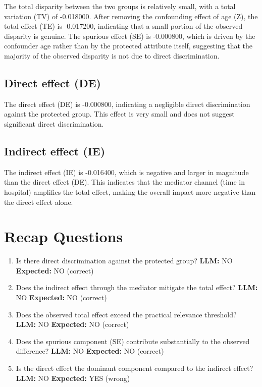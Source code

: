 \documentclass[11pt]{article}
\begin{document}
The total disparity between the two groups is relatively small, with a total variation (TV) of -0.018000. After removing the confounding effect of age (Z), the total effect (TE) is -0.017200, indicating that a small portion of the observed disparity is genuine. The spurious effect (SE) is -0.000800, which is driven by the confounder age rather than by the protected attribute itself, suggesting that the majority of the observed disparity is not due to direct discrimination.

\subsection{Direct effect (DE)}

The direct effect (DE) is -0.000800, indicating a negligible direct discrimination against the protected group. This effect is very small and does not suggest significant direct discrimination.

\subsection{Indirect effect (IE)}

The indirect effect (IE) is -0.016400, which is negative and larger in magnitude than the direct effect (DE). This indicates that the mediator channel (time in hospital) amplifies the total effect, making the overall impact more negative than the direct effect alone.

\section{Recap Questions}

\begin{enumerate}
\item Is there direct discrimination against the protected group? \textbf{LLM:} NO \quad \textbf{Expected:} NO \quad (correct)
\item Does the indirect effect through the mediator mitigate the total effect? \textbf{LLM:} NO \quad \textbf{Expected:} NO \quad (correct)
\item Does the observed total effect exceed the practical relevance threshold? \textbf{LLM:} NO \quad \textbf{Expected:} NO \quad (correct)
\item Does the spurious component (SE) contribute substantially to the observed difference? \textbf{LLM:} NO \quad \textbf{Expected:} NO \quad (correct)
\item Is the direct effect the dominant component compared to the indirect effect? \textbf{LLM:} NO \quad \textbf{Expected:} YES \quad (wrong)
\end{enumerate}
\end{document}
